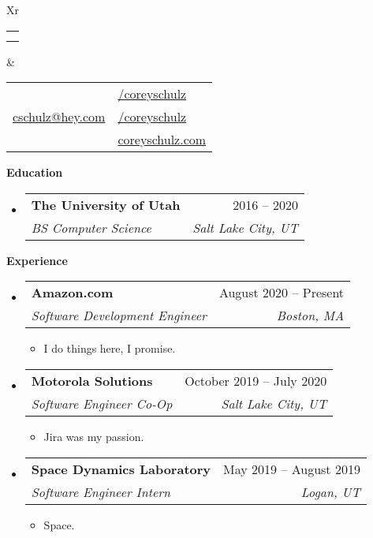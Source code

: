 \documentclass[letterpaper,12pt]{article}[leftmargin=*]
\makeatletter
\def \fullname {Corey Schulz}
\def \subtitle {}
\def \linkedinicon {\faLinkedin}
\def \linkedinlink {https://linkedin.com/in/coreyschulz/}
\def \linkedintext {/coreyschulz}
\def \phoneicon {\faPhone}
\def \phonetext {801.898.6226}
\def \emailicon {\faEnvelope}
\def \emaillink {mailto:cschulz@hey.com}
\def \emailtext {cschulz@hey.com}
\def \githubicon {\faGithub}
\def \githublink {https://github.com/coreyschulz}
\def \githubtext {/coreyschulz}
\def \websiteicon {\faGlobe}
\def \websitelink {https://coreyschulz.com/}
\def \websitetext { coreyschulz.com}
\def \headertype {\doublecol} %
\def \entryspacing {-0pt}
\def \linkedin {\linkedinicon \hspace{3pt}\href{\linkedinlink}{\linkedintext}}
\def \phone {\phoneicon \hspace{3pt}{ \phonetext}}
\def \email {\emailicon \hspace{3pt}\href{\emaillink}{\emailtext}}
\def \github {\githubicon \hspace{3pt}\href{\githublink}{\githubtext}}
\def \website {\websiteicon \hspace{3pt}\href{\websitelink}{\websitetext}}
\renewcommand{\section}[2]{\vspace{5pt}
  \colorbox{secondary}{\color{white}\raggedbottom\normalsize\textbf{{#1}{\hspace{7pt}#2}}}
}
\newcommand{\resumeEntryStart}{\begin{itemize}[leftmargin=2.5mm]}
\newcommand{\resumeEntryEnd}{\end{itemize}\vspace{\entryspacing}}
\newcommand{\resumeItemListStart}{\begin{itemize}[leftmargin=4.5mm]}
\newcommand{\resumeItemListEnd}{\end{itemize}}
\newcommand{\resumeItem}[1]{
  \item\small{
    {#1 \vspace{-2pt}}
  }
}
\newcommand{\resumeEntryTSDL}[4]{
  \vspace{-1pt}\item[]
    \begin{tabularx}{0.97\textwidth}{X@{\hspace{60pt}}r}
      \textbf{\color{primary}#1} & {\firabook\color{accent}\small#2} \\
      \textit{\color{accent}\small#3} & \textit{\color{accent}\small#4} \\
    \end{tabularx}\vspace{-6pt}
}
\newcommand{\doublecol}[6]{
  \begin{tabularx}{\textwidth}{Xr}
    {
      \begin{tabular}[c]{l}
        \fontsize{35}{45}\selectfont{\color{primary}{{\textbf{\fullname}}}} \\
        {\textit{\subtitle}} %
      \end{tabular}
    } & {
      \begin{tabular}[c]{l@{\hspace{1.5em}}l}
        {\small#4} & {\small#1} \\
        {\small#5} & {\small#2} \\
        {\small#6} & {\small#3}
      \end{tabular}
    }
  \end{tabularx}
}
\newcommand{\singlecol}[6]{
  \begin{tabularx}{\textwidth}{Xr}
    {
      \begin{tabular}[b]{l}
        \fontsize{35}{45}\selectfont{\color{primary}{{\textbf{\fullname}}}} \\
        {\textit{\subtitle}} %
      \end{tabular}
    } & {
      \begin{tabular}[c]{l}
        {\small#1} \\
        {\small#2} \\
        {\small#3} \\
        {\small#4} \\
        {\small#5} \\
        {\small#6}
      \end{tabular}
    }
  \end{tabularx}
}
\makeatother
\begin{document}


\headertype{\linkedin}{\github}{\website}{\phone}{\email}{} %
\vspace{-10pt} %

\section{\faGraduationCap}{Education}

  \resumeEntryStart
    \resumeEntryTSDL
      {The University of Utah}{2016 -- 2020}
      {BS Computer Science}{Salt Lake City, UT}
  \resumeEntryEnd

\section{\faPieChart}{Experience}

  \resumeEntryStart
    \resumeEntryTSDL
      {\faAmazon \hspace{3pt} Amazon.com}{August 2020 -- Present}
      {Software Development Engineer}{Boston, MA}
    \resumeItemListStart
      \resumeItem {I do things here, I promise.}
    \resumeItemListEnd
  \resumeEntryEnd

  \resumeEntryStart
    \resumeEntryTSDL
      {\faGlobe \hspace{3pt} Motorola Solutions}{October 2019 -- July 2020}
      {Software Engineer Co-Op}{Salt Lake City, UT}
    \resumeItemListStart
      \resumeItem {Jira was my passion.}
    \resumeItemListEnd
  \resumeEntryEnd

  \resumeEntryStart
    \resumeEntryTSDL
      {\faSpaceShuttle \hspace{3pt} Space Dynamics Laboratory}{May 2019 -- August 2019}
      {Software Engineer Intern}{Logan, UT}
    \resumeItemListStart
        \resumeItem {Space.}
    \resumeItemListEnd
  \resumeEntryEnd


\end{document}
